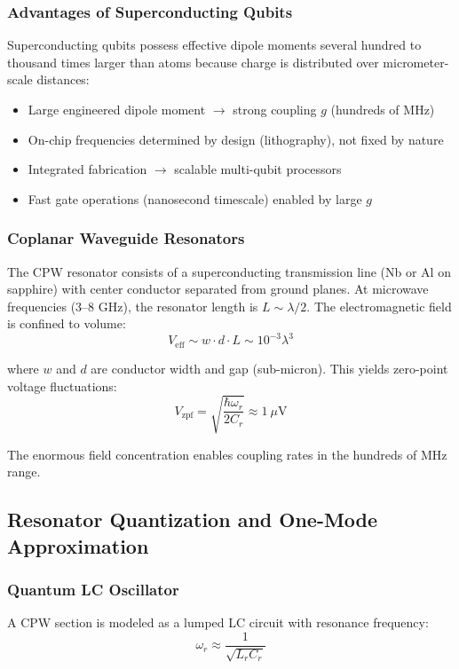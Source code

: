 \documentclass{article}
\begin{document}
\subsubsection*{Advantages of Superconducting Qubits}

Superconducting qubits possess effective dipole moments several hundred to thousand times larger than atoms because charge is distributed over micrometer-scale distances:

\begin{itemize}
    \item Large engineered dipole moment $\to$ strong coupling $g$ (hundreds of MHz)
    \item On-chip frequencies determined by design (lithography), not fixed by nature
    \item Integrated fabrication $\to$ scalable multi-qubit processors
    \item Fast gate operations (nanosecond timescale) enabled by large $g$
\end{itemize}

\subsubsection*{Coplanar Waveguide Resonators}

The CPW resonator consists of a superconducting transmission line (Nb or Al on sapphire) with center conductor separated from ground planes. At microwave frequencies (3--8 GHz), the resonator length is $L \sim \lambda/2$. The electromagnetic field is confined to volume:
$$V_{\text{eff}} \sim w \cdot d \cdot L \sim 10^{-3}\lambda^3$$

where $w$ and $d$ are conductor width and gap (sub-micron). This yields zero-point voltage fluctuations:
$$V_{\text{zpf}} = \sqrt{\frac{\hbar\omega_r}{2C_r}} \approx 1~\mu\text{V}$$

The enormous field concentration enables coupling rates in the hundreds of MHz range.

\subsection{Resonator Quantization and One-Mode Approximation}

\subsubsection*{Quantum LC Oscillator}

A CPW section is modeled as a lumped LC circuit with resonance frequency:
$$\omega_r \approx \frac{1}{\sqrt{L_r C_r}}$$
\end{document}
